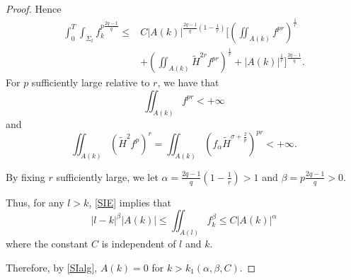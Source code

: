 \begin{proof}
    Hence
    \begin{equation*}
    \begin{split}
        \int_{0}^{T} \int_{\Sigma_t} f_{k}^{p \frac{2q-1}{q}} \leq &C \left| A(k) \right| ^{\frac{2q-1}{q}\left( 1-\frac{1}{r} \right) } [ \left( \iint_{A(k)}^{}f_{}^{pr}  \right) ^{\frac{1}{r}} \\
        &+ \left( \iint_{A(k)}^{}\tilde{H}^{2r} f_{}^{pr }  \right) ^{\frac{1}{r}}+\left| A(k) \right| ^{\frac{1}{r}} ] ^{\frac{2q-1}{q}}.
    \end{split}
    \end{equation*} 
    For $p$ sufficiently large relative to $r$, we have that 
    \[\iint_{A(k)}^{}f_{}^{pr } < + \infty \] and \[\iint_{A(k)}^{}\left( \tilde{H}^2f^p \right) ^r = \iint_{A(k)}^{}\left( f_{\alpha }\tilde{H}^{\sigma + \frac{2}{p}} \right) ^{pr}< + \infty .\]

    By fixing $r$ sufficiently large, we let $\alpha = \frac{2q-1}{q}\left( 1- \frac{1}{r} \right)>1 $ and $\beta = p \frac{2q-1}{q}>0 $.
    
    Thus, for any $l>k$, \autoref{SIE} implies that
    \[\left| l-k \right| ^{\beta }\left| A(k) \right| \leq \iint_{A(l)}^{}f_{k}^{\beta }  \leq C \left| A(k) \right| ^{\alpha }\]
    where the constant $C$ is independent of $l$ and $k$.

    Therefore, by \autoref{SIalg}, $A(k)=0$ for $k>k_1(\alpha , \beta , C)$. 
\end{proof}








\chapterend

